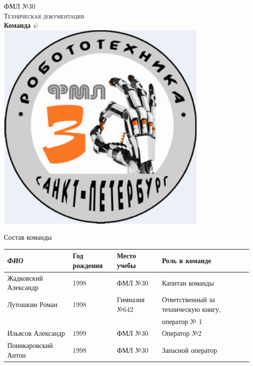 \documentclass[11pt]{article}
\begin{document}
   \begin{titlepage}
      \begin{center}
           \textsc{\LARGE{ФМЛ №30}}\\[1.5cm]
	\textsc{\Large Техническая документация}\\[0.5cm]
	{ \huge \bfseries Команда $\psi$ \\[0.4cm] }
	\includegraphics[width=105mm,height=105mm]{img/icon.jpg}
      \end{center}
   \end{titlepage}
	\newpage
	
	\LARGE{Состав команды}
		\begin{table}[h]
			\begin{tabular}{|l|l|l|l|}
				\hline
				\textit{ФИО}         & Год рождения & Место учебы   & Роль в команде                      \\ \hline
				Жадковский Александр &  1998        & ФМЛ №30       & Капитан команды                     \\ \hline
				Лутошкин Роман       &  1998        & Гимназия №642 & Ответственный за техническую книгу, \\
				                     &              &               & оператор № 1                        \\ \hline
				Ильясов Александр    &  1999        & ФМЛ №30       & Оператор №2                         \\ \hline
				Поникаровский Антон  & 1998         & ФМЛ №30       & Запасной оператор                   \\ \hline
			\end{tabular}
		\end{table}
		\newpage
		
\end{document}

